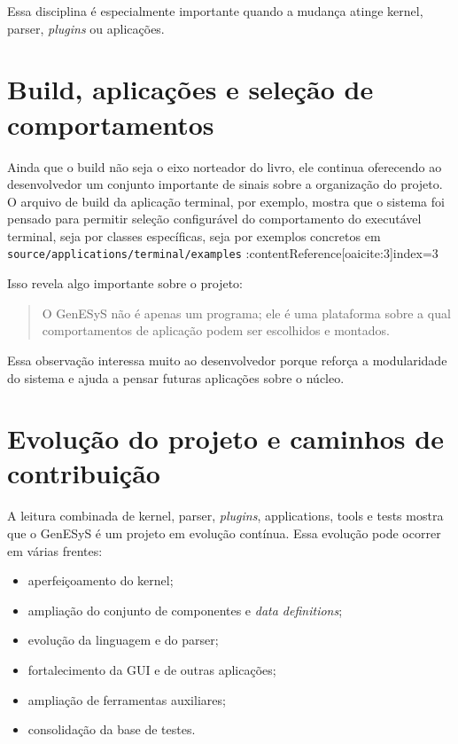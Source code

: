Essa disciplina é especialmente importante quando a mudança atinge kernel, parser, \textit{plugins} ou aplicações.

\section{Build, aplicações e seleção de comportamentos}
\label{sec:cap10_build_aplicacoes_selecao_comportamentos}

Ainda que o build não seja o eixo norteador do livro, ele continua oferecendo ao desenvolvedor um conjunto importante de sinais sobre a organização do projeto. O arquivo de build da aplicação terminal, por exemplo, mostra que o sistema foi pensado para permitir seleção configurável do comportamento do executável terminal, seja por classes específicas, seja por exemplos concretos em \texttt{source/applications/terminal/examples} :contentReference[oaicite:3]{index=3}

Isso revela algo importante sobre o projeto:
\begin{quote}
    O GenESyS não é apenas um programa; ele é uma plataforma sobre a qual comportamentos de aplicação podem ser escolhidos e montados.
\end{quote}

Essa observação interessa muito ao desenvolvedor porque reforça a modularidade do sistema e ajuda a pensar futuras aplicações sobre o núcleo.

\section{Evolução do projeto e caminhos de contribuição}
\label{sec:cap10_evolucao_projeto_caminhos_contribuicao}

A leitura combinada de kernel, parser, \textit{plugins}, applications, tools e tests mostra que o GenESyS é um projeto em evolução contínua. Essa evolução pode ocorrer em várias frentes:
\begin{itemize}
    \item aperfeiçoamento do kernel;
    \item ampliação do conjunto de componentes e \textit{data definitions};
    \item evolução da linguagem e do parser;
    \item fortalecimento da GUI e de outras aplicações;
    \item ampliação de ferramentas auxiliares;
    \item consolidação da base de testes.
\end{itemize}

